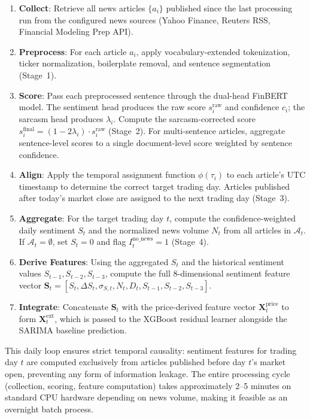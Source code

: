 \begin{enumerate}
    \item \textbf{Collect}: Retrieve all news articles $\{a_i\}$ published since the last processing run from the configured news sources (Yahoo Finance, Reuters RSS, Financial Modeling Prep API).
    \item \textbf{Preprocess}: For each article $a_i$, apply vocabulary-extended tokenization, ticker normalization, boilerplate removal, and sentence segmentation (Stage~1).
    \item \textbf{Score}: Pass each preprocessed sentence through the dual-head FinBERT model. The sentiment head produces the raw score $s_i^{\text{raw}}$ and confidence $c_i$; the sarcasm head produces $\lambda_i$. Compute the sarcasm-corrected score $s_i^{\text{final}} = (1 - 2\lambda_i) \cdot s_i^{\text{raw}}$ (Stage~2). For multi-sentence articles, aggregate sentence-level scores to a single document-level score weighted by sentence confidence.
    \item \textbf{Align}: Apply the temporal assignment function $\phi(\tau_i)$ to each article's UTC timestamp to determine the correct target trading day. Articles published after today's market close are assigned to the next trading day (Stage~3).
    \item \textbf{Aggregate}: For the target trading day $t$, compute the confidence-weighted daily sentiment $S_t$ and the normalized news volume $N_t$ from all articles in $\mathcal{A}_t$. If $\mathcal{A}_t = \emptyset$, set $S_t = 0$ and flag $I_t^{\text{no\_news}} = 1$ (Stage~4).
    \item \textbf{Derive Features}: Using the aggregated $S_t$ and the historical sentiment values $S_{t-1}, S_{t-2}, S_{t-3}$, compute the full 8-dimensional sentiment feature vector $\mathbf{S}_t = [S_t, \Delta S_t, \sigma_{S,t}, N_t, D_t, S_{t-1}, S_{t-2}, S_{t-3}]$.
    \item \textbf{Integrate}: Concatenate $\mathbf{S}_t$ with the price-derived feature vector $\mathbf{X}_t^{\text{price}}$ to form $\mathbf{X}_t^{\text{ext}}$, which is passed to the XGBoost residual learner alongside the SARIMA baseline prediction.
\end{enumerate}

This daily loop ensures strict temporal causality: sentiment features for trading day $t$ are computed exclusively from articles published before day $t$'s market open, preventing any form of information leakage. The entire processing cycle (collection, scoring, feature computation) takes approximately 2--5 minutes on standard CPU hardware depending on news volume, making it feasible as an overnight batch process.

